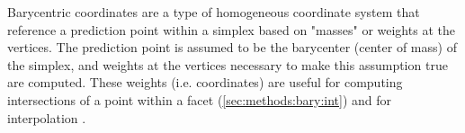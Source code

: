 \documentclass[preprint,12pt]{elsarticle}
\begin{document}
Barycentric coordinates are a type of homogeneous coordinate system that reference a prediction point within a simplex based on "masses" or weights at the vertices. The prediction point is assumed to be the barycenter (center of mass) of the simplex, and weights at the vertices necessary to make this assumption true are computed. These weights (i.e. coordinates) are useful for computing intersections of a point within a facet (\cref{sec:methods:bary:int}) and for interpolation \cite{langerSphericalBarycentricCoordinates2006}
.
\end{document}
